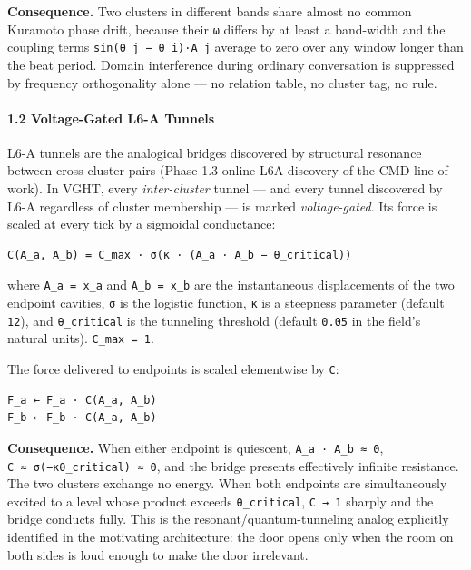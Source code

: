 \documentclass[
  11pt,
  a4paper,
]{article}
\begin{document}
\textbf{Consequence.} Two clusters in different bands share almost no
common Kuramoto phase drift, because their \texttt{ω} differs by at
least a band-width and the coupling terms
\texttt{sin(θ\_j\ −\ θ\_i)·A\_j} average to zero over any window longer
than the beat period. Domain interference during ordinary conversation
is suppressed by frequency orthogonality alone --- no relation table, no
cluster tag, no rule.

\paragraph{1.2 Voltage-Gated L6-A
Tunnels}\label{voltage-gated-l6-a-tunnels}

L6-A tunnels are the analogical bridges discovered by structural
resonance between cross-cluster pairs (Phase 1.3 online-L6A-discovery of
the CMD line of work). In VGHT, every \emph{inter-cluster} tunnel ---
and every tunnel discovered by L6-A regardless of cluster membership ---
is marked \emph{voltage-gated}. Its force is scaled at every tick by a
sigmoidal conductance:

\begin{verbatim}
C(A_a, A_b) = C_max · σ(κ · (A_a · A_b − θ_critical))
\end{verbatim}

where \texttt{A\_a\ =\ \textbar{}x\_a\textbar{}} and
\texttt{A\_b\ =\ \textbar{}x\_b\textbar{}} are the instantaneous
displacements of the two endpoint cavities, \texttt{σ} is the logistic
function, \texttt{κ} is a steepness parameter (default \texttt{12}), and
\texttt{θ\_critical} is the tunneling threshold (default \texttt{0.05}
in the field's natural units). \texttt{C\_max\ =\ 1}.

The force delivered to endpoints is scaled elementwise by \texttt{C}:

\begin{verbatim}
F_a ← F_a · C(A_a, A_b)
F_b ← F_b · C(A_a, A_b)
\end{verbatim}

\textbf{Consequence.} When either endpoint is quiescent,
\texttt{A\_a\ ·\ A\_b\ ≈\ 0}, \texttt{C\ ≈\ σ(−κθ\_critical)\ ≈\ 0}, and
the bridge presents effectively infinite resistance. The two clusters
exchange no energy. When both endpoints are simultaneously excited to a
level whose product exceeds \texttt{θ\_critical}, \texttt{C\ →\ 1}
sharply and the bridge conducts fully. This is the
resonant/quantum-tunneling analog explicitly identified in the
motivating architecture: the door opens only when the room on both sides
is loud enough to make the door irrelevant.
\end{document}
